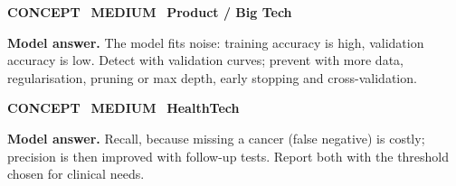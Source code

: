 \documentclass[11pt]{article}
\begin{document}
\begin{tcolorbox}[enhanced,breakable,colback=white,colframe=teal,arc=2mm,boxrule=0.8pt,left=3mm,right=3mm,
 title={\textbf{QV.04}\quad What is overfitting and how do you detect and prevent it?},fonttitle=\color{white}\small,colbacktitle=teal]
\colorbox{teal!15}{\scriptsize\bfseries\color{teal} CONCEPT}\
\colorbox{gold!85!black!15}{\scriptsize\bfseries\color{gold!85!black} MEDIUM}\
\colorbox{navy!8}{\scriptsize\bfseries\color{navy} Product / Big Tech}\par\smallskip
\textbf{\color{navy}Model answer.} The model fits noise: training accuracy is high, validation accuracy is low. Detect with validation curves; prevent with more data, regularisation, pruning or max depth, early stopping and cross-validation.
\end{tcolorbox}
\begin{tcolorbox}[enhanced,breakable,colback=white,colframe=teal,arc=2mm,boxrule=0.8pt,left=3mm,right=3mm,
 title={\textbf{QV.05}\quad Precision vs recall --- which matters more for cancer screening?},fonttitle=\color{white}\small,colbacktitle=teal]
\colorbox{teal!15}{\scriptsize\bfseries\color{teal} CONCEPT}\
\colorbox{gold!85!black!15}{\scriptsize\bfseries\color{gold!85!black} MEDIUM}\
\colorbox{navy!8}{\scriptsize\bfseries\color{navy} HealthTech}\par\smallskip
\textbf{\color{navy}Model answer.} Recall, because missing a cancer (false negative) is costly; precision is then improved with follow-up tests. Report both with the threshold chosen for clinical needs.
\end{tcolorbox}
\end{document}
